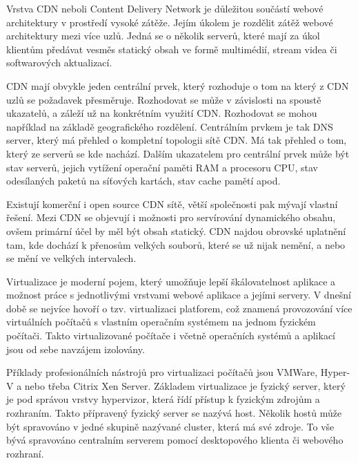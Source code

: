 \documentclass[12pt]{article}
\begin{document}
\obrazek
{}


Vrstva CDN neboli Content Delivery Network je důležitou součástí webové architektury v prostředí vysoké zátěže. Jejím úkolem je rozdělit zátěž webové architektury mezi více uzlů. Jedná se o několik serverů, které mají za úkol klientům předávat vesměs statický obsah ve formě multimédií, stream videa či softwarových aktualizací. 

CDN mají obvykle jeden centrální prvek, který rozhoduje o tom na který z CDN uzlů se požadavek přesměruje. Rozhodovat se může v závislosti na spoustě ukazatelů, a záleží už na konkrétním využití CDN. Rozhodovat se mohou například na základě geografického rozdělení. Centrálním prvkem je tak DNS server, který má přehled o kompletní topologii sítě CDN. Má tak přehled o tom, který ze serverů se kde nachází. Dalším ukazatelem pro centrální prvek může být stav serverů, jejich vytížení operační paměti RAM a procesoru CPU, stav odesílaných paketů na síťových kartách, stav cache pamětí apod. 

Existují komerční i open source CDN sítě, větší společnosti pak mývají vlastní řešení. Mezi CDN se objevují i možnosti pro servírování dynamického obsahu, ovšem primární účel by měl být obsah statický. CDN najdou obrovské uplatnění tam, kde dochází k přenosům velkých souborů, které se už nijak nemění, a nebo se mění ve velkých intervalech.\cite{cdn}

\obrazek
{}


Virtualizace je moderní pojem, který umožňuje lepší škálovatelnost aplikace a možnost práce s jednotlivými vrstvami webové aplikace a jejími servery. V dnešní době se nejvíce hovoří o tzv. virtualizaci platforem, což znamená provozování více virtuálních počítačů s vlastním operačním systémem na jednom fyzickém počítači. Takto virtualizované počítače i včetně operačních systémů a aplikací jsou od sebe navzájem izolovány. 

Příklady profesionálních nástrojů pro virtualizaci počítačů jsou VMWare, Hyper-V a nebo třeba Citrix Xen Server. Základem virtualizace je fyzický server, který je pod správou vrstvy hypervizor, která řídí přístup k fyzickým zdrojům a rozhraním. Takto přípravený fyzický server se nazývá host. Několik hostů může být spravováno v jedné skupině nazývané cluster, která má své zdroje. To vše bývá spravováno centralním serverem pomocí desktopového klienta či webového rozhraní.
\end{document}
